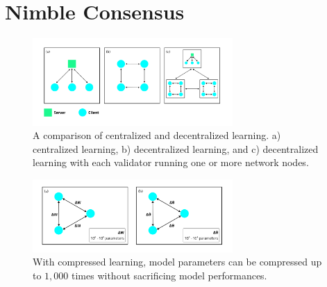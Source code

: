 \documentclass[11pt,letterpaper,twocolumn]{article}
\begin{document}
\section{Nimble Consensus}
\label{sec:consensus}

\begin{figure}[t]
\centering
\includegraphics[width=3in]{fig/decentralized-learning-hr.png}
\caption{A comparison of centralized and decentralized learning. a) centralized learning, b) decentralized learning, and c) decentralized
learning with each validator running one or more network nodes.} 
\label{fig:decentralized-learning}
\vspace{0pt}
\end{figure}

\begin{figure}[b]
\centering
\includegraphics[width=3in]{fig/compressed-learning-hr.png}
\caption{With compressed learning, model parameters can be compressed up to $1,000$ times without sacrificing model performances.} 
\label{fig:compressed-learning}
\vspace{0pt}
\end{figure}
\end{document}
